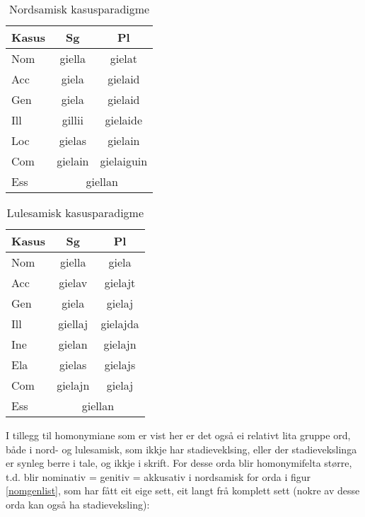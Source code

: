 \documentclass[a4paper,nynorsk]{article}
\begin{document}
\begin{table}[htdp]
\caption{Nordsamisk kasusparadigme}
\begin{center}
\begin{tabular}{|l|c|c|}
\hline
Kasus  & Sg & Pl \\
\hline
Nom & giella & gielat \\
\hline
Acc & giela & gielaid \\\cline{1-1}
Gen & giela & gielaid \\
\hline
Ill & gillii & gielaide \\
\hline
Loc & gielas & gielain \\
\hline
Com & gielain & gielaiguin \\
\hline
Ess & \multicolumn{2}{c|}{giellan}  \\
\hline
\end{tabular}
\end{center}
\label{smecas}
\end{table}%

\begin{table}[htdp]
\caption{Lulesamisk kasusparadigme}
\begin{center}
\begin{tabular}{|l|c|c|}
\hline
Kasus  & Sg & Pl \\
\hline
Nom & giella & giela \\
\hline
Acc & gielav & gielajt \\
\hline
Gen & giela & gielaj \\
\hline
Ill & giellaj & gielajda \\
\hline
Ine & gielan & gielajn \\
\hline
Ela & gielas & gielajs \\
\hline
Com & gielajn & gielaj \\
\hline
Ess & \multicolumn{2}{c|}{giellan}  \\
\hline
\end{tabular}
\end{center}
\label{smjcas}
\end{table}%

I tillegg til homonymiane som er vist her er det også ei relativt lita gruppe ord, både i nord- og lulesamisk, som ikkje har stadieveklsing, eller der stadievekslinga er synleg berre i tale, og ikkje i skrift. For desse orda blir homonymifelta større, t.d. blir nominativ = genitiv = akkusativ i nordsamisk for  orda i figur \ref{nomgenlist}, som har fått eit eige sett, eit langt frå komplett sett (nokre av desse orda kan også ha stadieveksling):%
\end{document}
